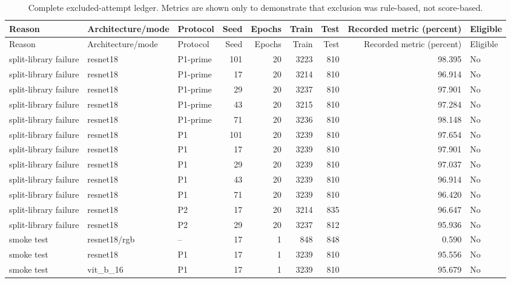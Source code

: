 \begin{longtable}{p{3.7cm}p{3.3cm}p{1.5cm}rrrrrp{1.2cm}}
\caption{Complete excluded-attempt ledger. Metrics are shown only to demonstrate that exclusion was rule-based, not score-based.}\label{tab:invalid-attempts}\\
\toprule
Reason & Architecture/mode & Protocol & Seed & Epochs & Train & Test & Recorded metric (percent) & Eligible \\
\midrule
\endfirsthead
\toprule
Reason & Architecture/mode & Protocol & Seed & Epochs & Train & Test & Recorded metric (percent) & Eligible \\
\midrule
\endhead
\bottomrule
\endfoot
split-library failure & resnet18 & P1-prime & 101 & 20 & 3223 & 810 & 98.395 & No \\ 
split-library failure & resnet18 & P1-prime & 17 & 20 & 3214 & 810 & 96.914 & No \\ 
split-library failure & resnet18 & P1-prime & 29 & 20 & 3237 & 810 & 97.901 & No \\ 
split-library failure & resnet18 & P1-prime & 43 & 20 & 3215 & 810 & 97.284 & No \\ 
split-library failure & resnet18 & P1-prime & 71 & 20 & 3236 & 810 & 98.148 & No \\ 
split-library failure & resnet18 & P1 & 101 & 20 & 3239 & 810 & 97.654 & No \\ 
split-library failure & resnet18 & P1 & 17 & 20 & 3239 & 810 & 97.901 & No \\ 
split-library failure & resnet18 & P1 & 29 & 20 & 3239 & 810 & 97.037 & No \\ 
split-library failure & resnet18 & P1 & 43 & 20 & 3239 & 810 & 96.914 & No \\ 
split-library failure & resnet18 & P1 & 71 & 20 & 3239 & 810 & 96.420 & No \\ 
split-library failure & resnet18 & P2 & 17 & 20 & 3214 & 835 & 96.647 & No \\ 
split-library failure & resnet18 & P2 & 29 & 20 & 3237 & 812 & 95.936 & No \\ 
smoke test & resnet18/rgb & -- & 17 & 1 & 848 & 848 & 0.590 & No \\ 
smoke test & resnet18 & P1 & 17 & 1 & 3239 & 810 & 95.556 & No \\ 
smoke test & vit\_b\_16 & P1 & 17 & 1 & 3239 & 810 & 95.679 & No \\ 
\end{longtable}
